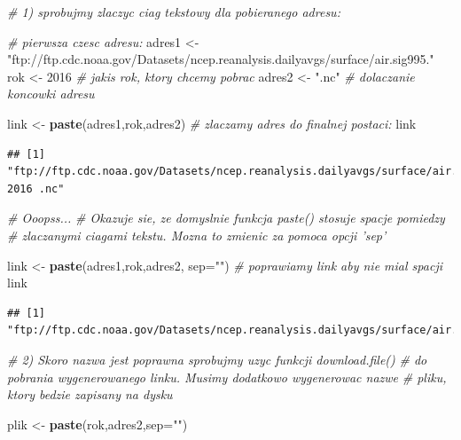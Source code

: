 \documentclass[]{book}
\newenvironment{Shaded}{\begin{snugshade}}{\end{snugshade}}
\newcommand{\KeywordTok}[1]{\textcolor[rgb]{0.13,0.29,0.53}{\textbf{#1}}}
\newcommand{\DataTypeTok}[1]{\textcolor[rgb]{0.13,0.29,0.53}{#1}}
\newcommand{\DecValTok}[1]{\textcolor[rgb]{0.00,0.00,0.81}{#1}}
\newcommand{\StringTok}[1]{\textcolor[rgb]{0.31,0.60,0.02}{#1}}
\newcommand{\CommentTok}[1]{\textcolor[rgb]{0.56,0.35,0.01}{\textit{#1}}}
\newcommand{\NormalTok}[1]{#1}
\theoremstyle{definition}
\theoremstyle{definition}
\theoremstyle{definition}
\theoremstyle{remark}
\begin{document}
\begin{Shaded}
\begin{Highlighting}[]
\CommentTok{# 1) sprobujmy zlaczyc ciag tekstowy dla pobieranego adresu:}

\CommentTok{# pierwsza czesc adresu:}
\NormalTok{adres1 <-}\StringTok{ "ftp://ftp.cdc.noaa.gov/Datasets/ncep.reanalysis.dailyavgs/surface/air.sig995."}
\NormalTok{rok <-}\StringTok{ }\DecValTok{2016} \CommentTok{# jakis rok, ktory chcemy pobrac}
\NormalTok{adres2 <-}\StringTok{ ".nc"} \CommentTok{# dolaczanie koncowki adresu}

\NormalTok{link <-}\StringTok{ }\KeywordTok{paste}\NormalTok{(adres1,rok,adres2) }\CommentTok{# zlaczamy adres do finalnej postaci:}
\NormalTok{link}
\end{Highlighting}
\end{Shaded}

\begin{verbatim}
## [1] "ftp://ftp.cdc.noaa.gov/Datasets/ncep.reanalysis.dailyavgs/surface/air.sig995. 2016 .nc"
\end{verbatim}

\begin{Shaded}
\begin{Highlighting}[]
\CommentTok{# Ooopss...}
\CommentTok{# Okazuje sie, ze domyslnie funkcja paste() stosuje spacje pomiedzy }
\CommentTok{# zlaczanymi ciagami tekstu. Mozna to zmienic za pomoca opcji 'sep'}

\NormalTok{link <-}\StringTok{ }\KeywordTok{paste}\NormalTok{(adres1,rok,adres2, }\DataTypeTok{sep=}\StringTok{""}\NormalTok{) }\CommentTok{# poprawiamy link aby nie mial spacji}
\NormalTok{link}
\end{Highlighting}
\end{Shaded}

\begin{verbatim}
## [1] "ftp://ftp.cdc.noaa.gov/Datasets/ncep.reanalysis.dailyavgs/surface/air.sig995.2016.nc"
\end{verbatim}

\begin{Shaded}
\begin{Highlighting}[]
\CommentTok{# 2) Skoro nazwa jest poprawna sprobujmy uzyc funkcji download.file() }
\CommentTok{#    do pobrania wygenerowanego linku. Musimy dodatkowo wygenerowac nazwe}
\CommentTok{#    pliku, ktory bedzie zapisany na dysku}

\NormalTok{plik <-}\StringTok{ }\KeywordTok{paste}\NormalTok{(rok,adres2,}\DataTypeTok{sep=}\StringTok{""}\NormalTok{)}
\end{Highlighting}
\end{Shaded}
\end{document}
